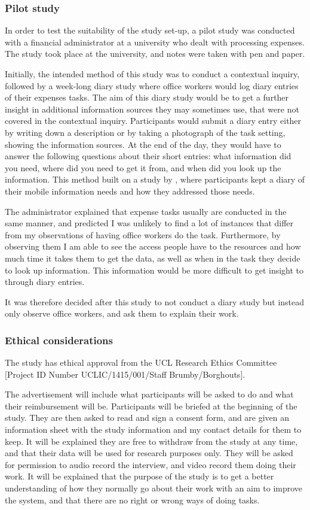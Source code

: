 \subsubsection{Pilot study}
In order to test the suitability of the study set-up, a pilot study was conducted with a financial administrator at a university who dealt with processing expenses. The study took place at the university, and notes were taken with pen and paper. 

Initially, the intended method of this study was to conduct a contextual inquiry, followed by a week-long diary study where office workers would log diary entries of their expenses tasks. The aim of this diary study would be to get a further insight in additional information sources they may sometimes use, that were not covered in the contextual inquiry.  Participants would submit a diary entry either by writing down a description or by taking a photograph of the task setting, showing the information sources. At the end of the day, they would have to answer the following questions about their short entries: what information did you need, where did you need to get it from, and when did you look up the information. This method built on a study by \citet{Sohn2008}, where participants kept a diary of their mobile information needs and how they addressed those needs. 

The administrator explained that expense tasks usually are conducted in the same manner, and predicted I was unlikely to find a lot of instances that differ from my observations of having office workers do the task.
Furthermore, by observing them I am able to see the access people have to the resources and how much time it takes them to get the data, as well as when in the task they decide to look up information. This information would be more difficult to get insight to through diary entries.

It was therefore decided after this study to not conduct a diary study but instead only observe office workers, and ask them to explain their work.

\subsubsection{Ethical considerations}
The study has ethical approval from the UCL Research Ethics Committee [Project ID Number UCLIC/1415/001/Staff Brumby/Borghouts]. 

The advertisement will include what participants will be asked to do and what their reimbursement will be. 
Participants will be briefed at the beginning of the study. They are then asked to read and sign a consent form, and are given an information sheet with the study information and my contact details for them to keep. 
It will be explained they are free to withdraw from the study at any time, and that their data will be used for research purposes only. They will be asked for permission to audio record the interview, and video record them doing their work. It will be explained that the purpose of the study is to get a better understanding of how they normally go about their work with an aim to improve the system, and that there are no right or wrong ways of doing tasks. 

